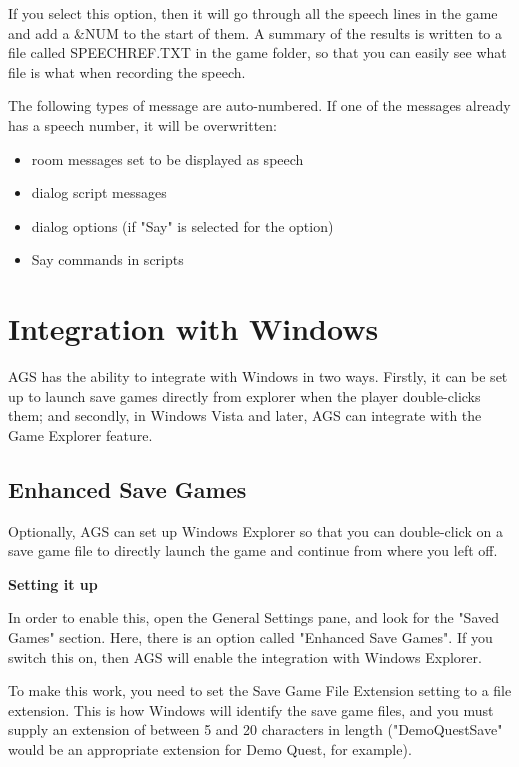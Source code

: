 If you select this option, then it will go through all the speech lines in the game and
add a &NUM to the start of them. A summary of the results is written to a file called
SPEECHREF.TXT in the game folder, so that you can easily see what file is what when
recording the speech.

The following types of message are auto-numbered. If one of the messages already has a speech
number, it will be overwritten:
\begin{itemize}
\item room messages set to be displayed as speech
\item dialog script messages
\item dialog options (if "Say" is selected for the option)
\item Say commands in scripts
\end{itemize}


\section{Integration with Windows}%

AGS has the ability to integrate with Windows in two ways. Firstly, it can
be set up to launch save games directly from explorer when the player double-clicks
them; and secondly, in Windows Vista and later, AGS can integrate with the Game Explorer feature.


\subsection{Enhanced Save Games}\label{EnhancedSaveGames}%

Optionally, AGS can set up Windows Explorer so that you can double-click on a save game
file to directly launch the game and continue from where you left off.

\bf{Setting it up}

In order to enable this, open the General Settings pane, and look for the "Saved Games"
section. Here, there is an option called "Enhanced Save Games". If you switch this on,
then AGS will enable the integration with Windows Explorer.

To make this work, you need to set the Save Game File Extension setting to a file extension.
This is how Windows will identify the save game files, and you must supply an extension
of between 5 and 20 characters in length ("DemoQuestSave" would be an appropriate
extension for Demo Quest, for example).

